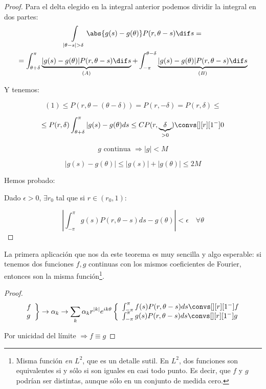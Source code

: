 \begin{proof}

				Para el delta elegido en la integral anterior podemos dividir la integral en dos partes: \begin{multline*}
				\int\limits_{|\theta - s | > \delta} \abs{g(s) - g(\theta)} P(r, \theta-s) \dif s = \\
				= \int_{\theta+\delta}^\pi \underbrace{|g(s) - g(\theta)| P(r, \theta-s) \dif s}_{(A)} +  \int_{-\pi}^{\theta-\delta} \underbrace{|g(s) - g(\theta)| P(r, \theta-s) \dif s}_{(B)}
				\end{multline*}

				Y tenemos:

				\[ (1) \leq P(r, \theta-(\theta-\delta)) = P(r, -\delta) = P(r, \delta) \leq  \]

				\[\leq P(r, \delta) \int^{\pi}_{\theta+\delta} |g(s) - g(\theta) ds \leq C P(r, \underbrace{\delta}_{> 0}) \convs[][r][1^-] 0  \]

				\[g \text{ continua } \Rightarrow |g| < M \]

				\[ |g(s)  - g(\theta)| \leq |g(s)| + | g(\theta) | \leq 2M \]


				Hemos probado:

				Dado $\epsilon > 0$, $\exists r_0$ tal que si $r \in (r_0,1)$:

				\[ \left| \int_{-\pi}^\pi g(s) P(r, \theta-s) ds - g(\theta)  \right| < \epsilon \quad \forall \theta \]

			\end{proof}

		La primera aplicación que nos da este teorema es muy sencilla y algo esperable: si tenemos dos funciones $f,g$ continuas con los mismos coeficientes de Fourier, entonces son la misma función\footnote{Misma función \textit{en $L^2$}, que es un detalle sutil. En $L^2$, dos funciones son equivalentes si y sólo si son iguales en casi todo punto. Es decir, que $f$ y $g$ podrían ser distintas, aunque sólo en un conjunto de medida cero.}.

		\begin{proof}
			\[
				\left. \begin{array}{l}
				f \\
				g
				\end{array} \right\} \rightarrow \alpha_k \rightarrow \sum_k \alpha_k r^{|k|} e^{ik\theta} \left\{ \begin{array}{l}
					\int^{\pi}_{-\pi} f(s) P(r, \theta - s)ds \convs[][r][1^-] f \\
					\int^{\pi}_{-\pi} g(s) P(r, \theta - s)ds \convs[][r][1^-] g
				\end{array} \right.
			\]

			Por unicidad del límite $\Rightarrow f \equiv g$
		\end{proof}

